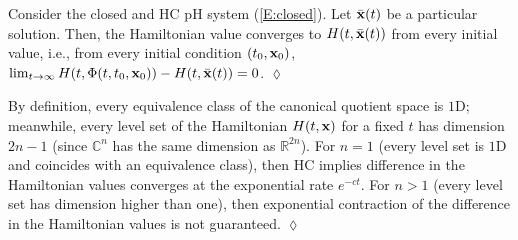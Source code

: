 \begin{proposition} \label{prop_limit_cycle}
Consider the closed and HC pH system (\ref{E:closed}). Let $\bar{\mathbf{x}}(t)$ be a particular solution. Then, the Hamiltonian value converges to $H(t, \bar{\mathbf{x}}(t))$ from every initial value, i.e., %
from every initial condition $(t_0, \mathbf{x}_0)$, $\lim_{t\to \infty} H(t, \Phi(t, t_0, \mathbf{x}_0)) - H(t, \bar{\mathbf{x}}(t)) = 0$.  \hfill $\lozenge$
\end{proposition}




\begin{remark}
By definition, every equivalence class of the canonical quotient space is $1$D; meanwhile, every level set of the Hamiltonian $H(t, \mathbf{x})$ for a fixed $t$ has dimension $2n - 1$ (since $\mathbb{C}^n$ has the same dimension as $\mathbb{R}^{2n}$). For $n = 1$ (every level set is $1$D and coincides with an equivalence class), then HC implies difference in the Hamiltonian values converges at the exponential rate $e^{-ct}$. For $n > 1$ (every level set has dimension higher than one), then exponential contraction of the difference in the Hamiltonian values is not guaranteed. \hfill $\lozenge$
\end{remark}

